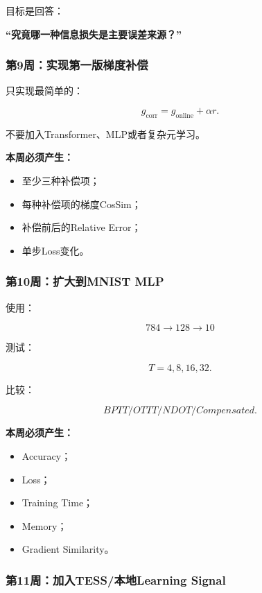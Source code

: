 \documentclass[journal,12pt,onecolumn]{IEEEtran}
\begin{document}
目标是回答：

\begin{center}
\textbf{“究竟哪一种信息损失是主要误差来源？”}
\end{center}

\subsubsection{第9周：实现第一版梯度补偿}

只实现最简单的：

\[
g_{\mathrm{corr}}
=
g_{\mathrm{online}}
+
\alpha r.
\]

不要加入Transformer、MLP或者复杂元学习。

\textbf{本周必须产生：}

\begin{itemize}
    \item 至少三种补偿项；
    \item 每种补偿项的梯度CosSim；
    \item 补偿前后的Relative Error；
    \item 单步Loss变化。
\end{itemize}

\subsubsection{第10周：扩大到MNIST MLP}

使用：

\[
784\rightarrow128\rightarrow10
\]

测试：

\[
T=4,8,16,32.
\]

比较：

\[
BPTT/OTTT/NDOT/Compensated.
\]

\textbf{本周必须产生：}

\begin{itemize}
    \item Accuracy；
    \item Loss；
    \item Training Time；
    \item Memory；
    \item Gradient Similarity。
\end{itemize}

\subsubsection{第11周：加入TESS/本地Learning Signal}
\end{document}
